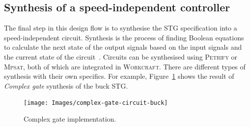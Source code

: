 \documentclass[british, journal]{IEEEtran}
\newcommand{\noun}[1]{\textsc{#1}}
\begin{document}
%
%


\subsection{Synthesis of a speed-independent controller}


The final step in this design flow is to synthesise the STG specification into
a speed-independent circuit. Synthesis is the process of finding Boolean equations
to calculate the next state of the output signals based on the input signals
and the current state of the circuit~\cite{Cortadella}. Circuits can be
synthesised using \noun{Petrify} or \noun{Mpsat}, both of which are
integrated in \noun{Workcraft}. There are different types of synthesis
with their own specifics. For example, Figure~\ref{fig:complex-gate-circuit}
shows the result of \emph{Complex gate} synthesis of the buck STG.

\begin{figure}[h]
\begin{centering}
\texttt{[image: Images/complex-gate-circuit-buck]}
\par\end{centering}

\protect\caption{\label{fig:complex-gate-circuit}Complex gate implementation.}
\end{figure}
\end{document}
